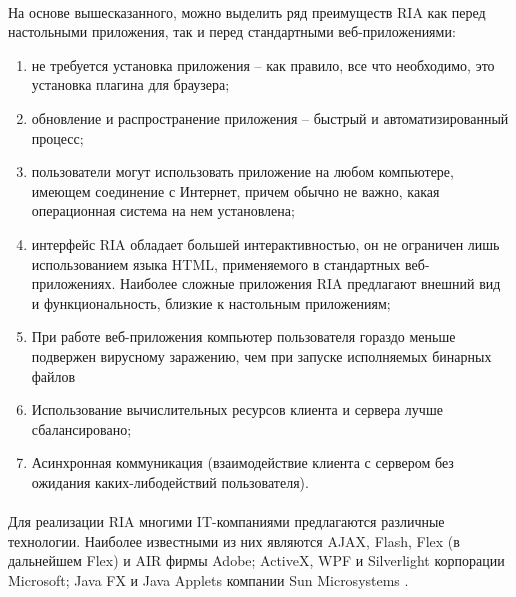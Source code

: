 \paragraph{ }

На основе вышесказанного, можно выделить ряд преимуществ RIA  как перед настольными приложения, так и перед стандартными веб-приложениями:

\begin{enumerate}

\item не требуется установка приложения – как правило, все что необходимо, это установка плагина для браузера;
\item обновление и распространение приложения  – быстрый и автоматизированный процесс;
\item пользователи могут использовать приложение на любом компьютере, имеющем соединение с Интернет, причем обычно не важно, какая операционная система на нем установлена;
\item интерфейс  RIA обладает большей интерактивностью, он не ограничен лишь использованием языка HTML, применяемого в стандартных веб-приложениях. Наиболее сложные приложения RIA предлагают внешний вид и функциональность, близкие к настольным приложениям;
\item При работе веб-приложения компьютер пользователя гораздо меньше подвержен вирусному заражению, чем при запуске исполняемых бинарных файлов
\item Использование вычислительных ресурсов клиента и сервера лучше сбалансировано;
\item Асинхронная коммуникация (взаимодействие клиента с сервером без ожидания каких-либодействий пользователя).

\end{enumerate}

\paragraph{ }

Для реализации RIA многими IT-компаниями предлагаются различные технологии. Наиболее известными из них являются AJAX,  Flash, Flex (в дальнейшем Flex)  и AIR  фирмы Adobe; ActiveX, WPF  и Silverlight  корпорации Microsoft; Java FX  и Java Applets  компании Sun Microsystems .

\paragraph{ }
 

